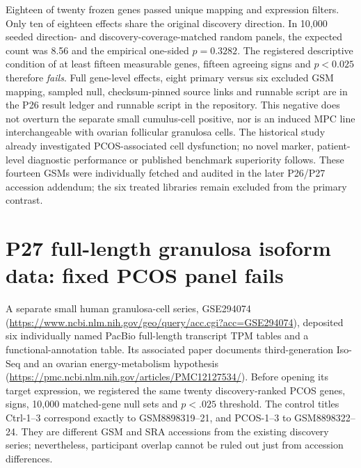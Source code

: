 \documentclass[11pt,a4paper]{article}
\begin{document}
Eighteen of twenty frozen genes passed unique mapping and expression filters. Only ten of eighteen effects share the original discovery direction. In 10,000 seeded direction- and discovery-coverage-matched random panels, the expected count was 8.56 and the empirical one-sided $p=0.3282$. The registered descriptive condition of at least fifteen measurable genes, fifteen agreeing signs and $p<0.025$ therefore \emph{fails}. Full gene-level effects, eight primary versus six excluded GSM mapping, sampled null, checksum-pinned source links and runnable script are in the P26 result ledger and runnable script in the repository. This negative does not overturn the separate small cumulus-cell positive, nor is an induced MPC line interchangeable with ovarian follicular granulosa cells. The historical study already investigated PCOS-associated cell dysfunction; no novel marker, patient-level diagnostic performance or published benchmark superiority follows. These fourteen GSMs were individually fetched and audited in the later P26/P27 accession addendum; the six treated libraries remain excluded from the primary contrast.

\section{P27 full-length granulosa isoform data: fixed PCOS panel fails}
A separate small human granulosa-cell series, GSE294074 (\url{https://www.ncbi.nlm.nih.gov/geo/query/acc.cgi?acc=GSE294074}), deposited six individually named PacBio full-length transcript TPM tables and a functional-annotation table. Its associated paper documents third-generation Iso-Seq and an ovarian energy-metabolism hypothesis (\url{https://pmc.ncbi.nlm.nih.gov/articles/PMC12127534/}). Before opening its target expression, we registered the same twenty discovery-ranked PCOS genes, signs, 10,000 matched-gene null sets and $p<.025$ threshold. The control titles Ctrl-1--3 correspond exactly to GSM8898319--21, and PCOS-1--3 to GSM8898322--24. They are different GSM and SRA accessions from the existing discovery series; nevertheless, participant overlap cannot be ruled out just from accession differences.
\end{document}
